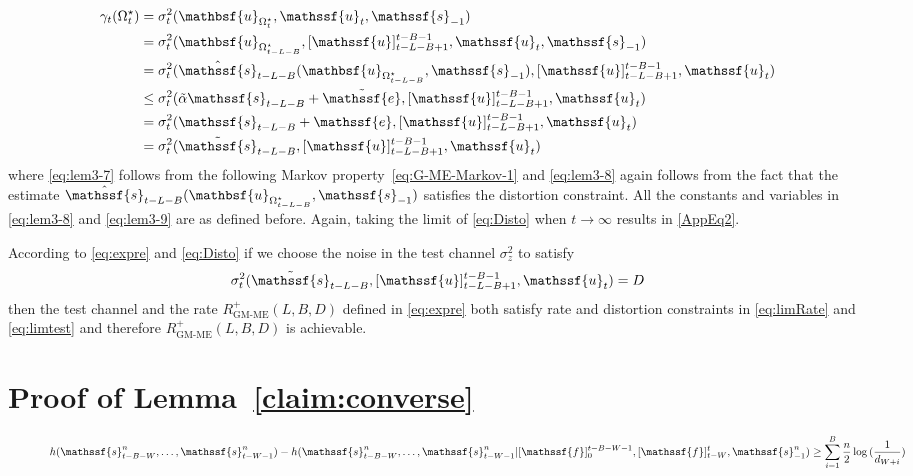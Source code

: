 \documentclass[journal, twocolumn, 10pt]{IEEEtran}
\newcommand{\rve}{{\mathssf{e}}}    %
\newcommand{\rvf}{{\mathssf{f}}}    %
\newcommand{\rvs}{{\mathssf{s}}}    %
\newcommand{\rvu}{{\mathssf{u}}}    %
\newcommand{\rvbu}{{\mathbsf{u}}}
\begin{document}
{%
\begin{align}
 \gamma_{t}(\Omega^{\star}_t)  &= \sigma^{2}_{t}( \rvbu_{\Omega^{\star}_{t}}, \rvu_{t}, \rvs_{-1}) \notag\\
&=   \sigma^{2}_{t}( \rvbu_{\Omega^{\star}_{t-L-B}}, [\rvu]_{t-L-B+1}^{t-B-1},\rvu_{t}, \rvs_{-1})\notag\\
&=   \sigma^{2}_{t}( \hat{\rvs}_{t-L-B}(\rvbu_{\Omega^{\star}_{t-L-B}}, \rvs_{-1}), [\rvu]_{t-L-B+1}^{t-B-1}, \rvu_{t})\label{eq:lem3-7}\\
&\le   \sigma^{2}_{t}( \tilde{\alpha} {\rvs}_{t-L-B} + \tilde{\rve}, [\rvu]_{t-L-B+1}^{t-B-1}, \rvu_{t}) \label{eq:lem3-8}\\
&=   \sigma^{2}_{t}({\rvs}_{t-L-B} + {\rve}, [\rvu]_{t-L-B+1}^{t-B-1}, \rvu_{t}) \label{eq:lem3-9}\\
&=   \sigma^{2}_{t}( \tilde{\rvs}_{t-L-B}, [\rvu]_{t-L-B+1}^{t-B-1},\rvu_{t}) \label{eq:Disto}
\end{align} where \eqref{eq:lem3-7} follows from the following Markov property~\eqref{eq:G-ME-Markov-1}
 and \eqref{eq:lem3-8} again follows from the fact that the estimate $\hat{\rvs}_{t-L-B}(\rvbu_{\Omega^{\star}_{t-L-B}}, \rvs_{-1})$ satisfies the distortion constraint. All the constants and variables in \eqref{eq:lem3-8} and \eqref{eq:lem3-9} are as defined before. Again, taking the limit of \eqref{eq:Disto} when $t\to \infty$ results in \eqref{AppEq2}.

According to \eqref{eq:expre} and \eqref{eq:Disto} if we choose the noise in the test channel $\sigma^2_{z}$ to satisfy 
\begin{align}
\sigma^{2}_{t}( \tilde{\rvs}_{t-L-B}, [\rvu]_{t-L-B+1}^{t-B-1},\rvu_{t}) =D
\end{align} then the test channel and the rate $R^{+}_{\textrm{GM-ME}}(L,B,D)$ defined in \eqref{eq:expre} both satisfy rate and distortion constraints in \eqref{eq:limRate} and \eqref{eq:limtest} and therefore $R^{+}_{\textrm{GM-ME}}(L,B,D)$ is achievable.


\section{Proof of Lemma~\ref{claim:converse}}
\label{app:NEWapp}

\begin{figure}
\begin{align}
h(\rvs_{t-B-W}^n, \ldots, \rvs_{t-W-1}^n)-h(\rvs_{t-B-W}^n, \ldots, \rvs_{t-W-1}^n|[\rvf]_{0}^{{t-B-W-1}}, [\rvf]_{t-W}^{t}, \rvs_{-1}^n)
 \ge \sum_{i=1}^{B}\frac{n}{2}\log{(\frac{1}{d_{W+i}})}\label{eq:Gauss_LB_T1App}
\end{align}
\end{figure}

}
\end{document}

